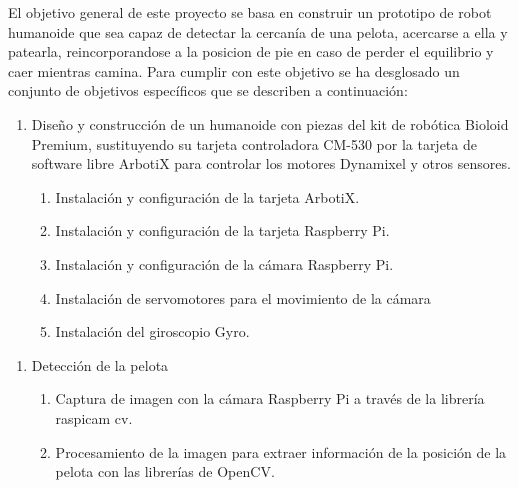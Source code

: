El objetivo general de este proyecto se basa en construir un prototipo de robot humanoide que sea capaz de detectar la cercanía
de una pelota, acercarse a ella y patearla, reincorporandose a la posicion de pie en caso de perder el equilibrio y caer
mientras camina. Para cumplir con este objetivo se ha desglosado un conjunto de objetivos específicos que se describen 
a continuación: 

\begin{enumerate}
\item  Diseño y construcción de un humanoide con piezas del kit de robótica Bioloid Premium, sustituyendo su tarjeta controladora
CM-530 por la tarjeta de software libre ArbotiX para controlar los motores Dynamixel y otros sensores.
\begin{enumerate}
\item Instalación y configuración de la tarjeta ArbotiX.
\item Instalación y configuración de la tarjeta Raspberry Pi.
\item Instalación y configuración de la cámara Raspberry Pi.
\item Instalación de servomotores  para el movimiento de la cámara
\item Instalación del giroscopio Gyro.
 
\end{enumerate}
\end{enumerate}

\begin{enumerate}
\item Detección de la pelota
\begin{enumerate}
\item  Captura de imagen con la cámara Raspberry Pi a través de la librería raspicam cv.
\item Procesamiento de la imagen para extraer información de la posición de la pelota con las librerías de OpenCV.
\end{enumerate}

\end{enumerate}

